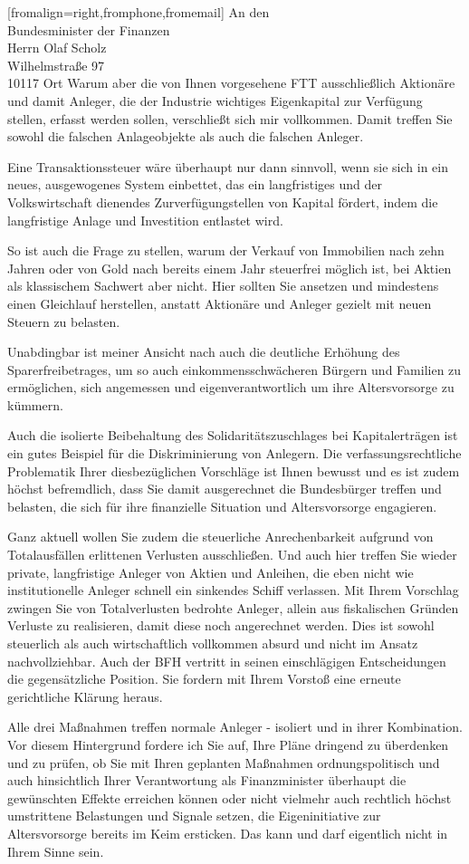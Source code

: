 \documentclass[ version=last,
                backaddress=on,
                12pt,
                a4paper,
                firstfoot=false,
                fromrule=false,
                fromlogo=false,
                enlargefirstpage=true]{scrlttr2}
\begin{document}
\begin{letter}[fromalign=right,fromphone,fromemail]{
An den\\
Bundesminister der Finanzen\\
Herrn Olaf Scholz\\
Wilhelmstraße 97\\
10117 Ort
}
Warum aber die von Ihnen vorgesehene FTT ausschließlich Aktionäre und damit
    Anleger, die der Industrie wichtiges Eigenkapital zur Verfügung stellen,
    erfasst werden sollen, verschließt sich mir vollkommen. Damit treffen Sie
    sowohl die falschen Anlageobjekte als auch die falschen Anleger.

Eine Transaktionssteuer wäre überhaupt nur dann sinnvoll, wenn sie sich in ein
    neues, ausgewogenes System einbettet, das ein langfristiges und der
    Volkswirtschaft dienendes Zurverfügungstellen von Kapital fördert, indem
    die langfristige Anlage und Investition entlastet wird. 

So ist auch die Frage zu stellen, warum der Verkauf von Immobilien nach zehn
    Jahren oder von Gold nach bereits einem Jahr steuerfrei möglich ist, bei
    Aktien als klassischem Sachwert aber nicht. Hier sollten Sie ansetzen und
    mindestens einen Gleichlauf herstellen, anstatt Aktionäre und Anleger
    gezielt mit neuen Steuern zu belasten.

Unabdingbar ist meiner Ansicht nach auch die deutliche Erhöhung des
    Sparerfreibetrages, um so auch einkommensschwächeren Bürgern und Familien
    zu ermöglichen, sich angemessen und eigenverantwortlich um ihre
    Altersvorsorge zu kümmern. 

Auch die isolierte Beibehaltung des Solidaritätszuschlages bei Kapitalerträgen
ist ein gutes Beispiel für die Diskriminierung von Anlegern. Die
verfassungsrechtliche Problematik Ihrer diesbezüglichen Vorschläge ist Ihnen
bewusst und es ist zudem höchst befremdlich, dass Sie damit ausgerechnet die
Bundesbürger treffen und belasten, die sich für ihre finanzielle Situation und
Altersvorsorge engagieren.

Ganz aktuell wollen Sie zudem die steuerliche Anrechenbarkeit aufgrund von
Totalausfällen erlittenen Verlusten ausschließen. Und auch hier treffen Sie
wieder private, langfristige Anleger von Aktien und Anleihen, die eben nicht
wie institutionelle Anleger schnell ein sinkendes Schiff verlassen. Mit Ihrem
Vorschlag zwingen Sie von Totalverlusten bedrohte Anleger, allein aus
fiskalischen Gründen Verluste zu realisieren, damit diese noch angerechnet
werden. Dies ist sowohl steuerlich als auch wirtschaftlich vollkommen absurd
und nicht im Ansatz nachvollziehbar. Auch der BFH vertritt in seinen
einschlägigen Entscheidungen die gegensätzliche Position. Sie fordern mit Ihrem
Vorstoß eine erneute gerichtliche Klärung heraus.

Alle drei Maßnahmen treffen normale Anleger - isoliert und in ihrer
Kombination. Vor diesem Hintergrund fordere ich Sie auf, Ihre Pläne dringend zu
überdenken und zu prüfen, ob Sie mit Ihren geplanten Maßnahmen
ordnungspolitisch und auch hinsichtlich Ihrer Verantwortung als Finanzminister
überhaupt die gewünschten Effekte erreichen können oder nicht vielmehr auch
rechtlich höchst umstrittene Belastungen und Signale setzen, die
Eigeninitiative zur Altersvorsorge bereits im Keim ersticken. Das kann und darf
eigentlich nicht in Ihrem Sinne sein.



\end{letter}
\end{document}
